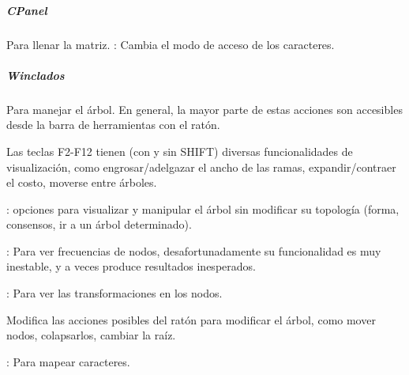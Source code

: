 \subparagraph*{CPanel}
Para llenar la matriz.
: Cambia el modo de acceso de los caracteres.
\subparagraph*{Winclados}
Para manejar el \'arbol. En general, la mayor parte de estas acciones son accesibles desde la barra de herramientas con el rat\'on.

Las teclas F2-F12 tienen (con y sin SHIFT) diversas funcionalidades de visualizaci\'on, como engrosar/adelgazar el ancho de las ramas, expandir/contraer el costo, moverse entre \'arboles.

: opciones para visualizar y manipular el \'arbol sin modificar su topolog\'ia (forma, consensos, ir a un \'arbol determinado).

: Para ver frecuencias de nodos, desafortunadamente su funcionalidad es muy inestable, y a veces produce resultados inesperados.

: Para ver las transformaciones en los nodos.

 Modifica las acciones posibles del rat\'on para modificar el \'arbol, como mover nodos, colapsarlos, cambiar la ra\'iz.

: Para mapear caracteres.
